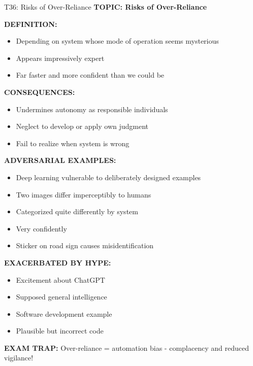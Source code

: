 \documentclass[8pt]{beamer}
\begin{document}
	\begin{frame}{T36: Risks of Over-Reliance}
		\fontsize{6.5}{7.5}\selectfont
		\textbf{TOPIC: Risks of Over-Reliance}
		
		\vspace{0.1cm}
		\textbf{DEFINITION:}
		\begin{itemize}
			\item Depending on system whose mode of operation seems mysterious
			\item Appears impressively expert
			\item Far faster and more confident than we could be
		\end{itemize}
		
		\vspace{0.1cm}
		\textbf{CONSEQUENCES:}
		\begin{itemize}
			\item Undermines autonomy as responsible individuals
			\item Neglect to develop or apply own judgment
			\item Fail to realize when system is wrong
		\end{itemize}
		
		\vspace{0.1cm}
		\textbf{ADVERSARIAL EXAMPLES:}
		\begin{itemize}
			\item Deep learning vulnerable to deliberately designed examples
			\item Two images differ imperceptibly to humans
			\item Categorized quite differently by system
			\item Very confidently
			\item Sticker on road sign causes misidentification
		\end{itemize}
		
		\vspace{0.1cm}
		\textbf{EXACERBATED BY HYPE:}
		\begin{itemize}
			\item Excitement about ChatGPT
			\item Supposed general intelligence
			\item Software development example
			\item Plausible but incorrect code
		\end{itemize}
		
		\textcolor{myred}{\textbf{EXAM TRAP:}} Over-reliance = \textcolor{myblue}{automation bias - complacency and reduced vigilance}!
	\end{frame}
	
\end{document}
